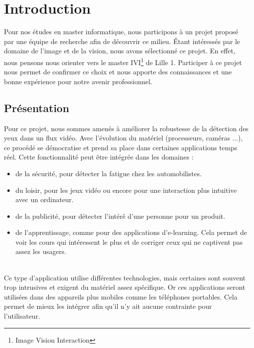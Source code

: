 \section{Introduction}

Pour nos études en master informatique, nous participons à un projet proposé par une 
équipe de recherche afin de découvrir ce milieu. 
Étant intéressés par le domaine de l'image et de la vision, nous avons sélectionné ce projet. 
En effet, nous pensons nous orienter vers le master IVI\footnote{Image Vision Interaction} de 
Lille 1. Participer à ce projet nous permet de confirmer ce choix et nous apporte des 
connaissances et une bonne expérience pour notre avenir professionnel.

\subsection{Présentation}
Pour ce projet, nous sommes amenés à améliorer la robustesse de la détection des yeux dans un flux vidéo.
Avec l'évolution du matériel (processeurs, caméras ...), ce procédé se démocratise et prend sa place 
dans certaines applications temps réel. Cette fonctionnalité peut être intégrée dans les domaines : 
\begin{itemize}
 \item de la sécurité, pour détecter la fatigue chez les automobilistes.
 \item du loisir, pour les jeux vidéo ou encore pour une interaction plus intuitive avec un ordinateur.
 \item de la publicité, pour détecter l'intérê d'une personne pour un produit. 
 \item de l'apprentissage, comme pour des applications d'e-learning. Cela permet de voir les cours
 qui intéressent le plus et de corriger ceux qui ne captivent pas assez les usagers.
\end{itemize}
\ \\
Ce type d'application utilise différentes technologies, mais certaines sont souvent trop intrusives 
et exigent du matériel assez spécifique. Or ces applications seront utilisées dans des appareils plus mobiles
comme les téléphones portables. Cela permet de mieux les intégrer afin qu'il n'y ait aucune contrainte pour l'utilisateur.


